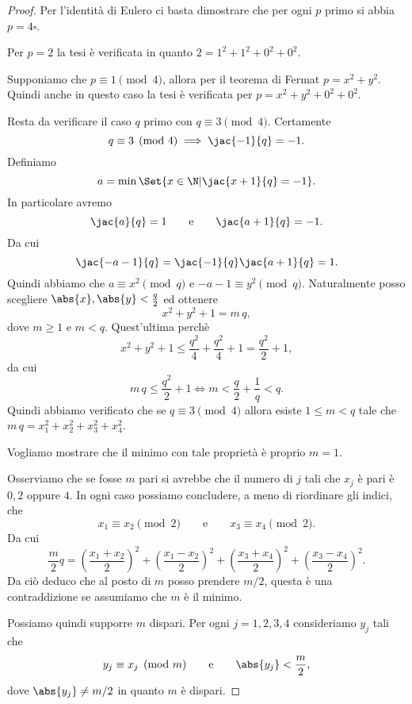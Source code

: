 \begin{proof}
	Per l'identità di Eulero ci basta dimostrare che per ogni \(p\) primo si abbia \(p=4\square\).

	Per \(p=2\) la tesi è verificata in quanto \(2=1^2+1^2+0^2+0^2\).

	Supponiamo che \(p\equiv 1 \pmod{4}\), allora per il teorema di Fermat \(p=x^2+y^2\).
	Quindi anche in questo caso la tesi è verificata per \(p=x^2+y^2+0^2+0^2\).

	Resta da verificare il caso \(q\) primo con \(q\equiv 3 \pmod{4}\).
	Certamente
	\[
		q\equiv 3 \pmod{4} \implies \jac{-1}{q} = -1.
	\]
	Definiamo
	\[
		a = \min\Set{x\in\N | \jac{x+1}{q}=-1}.
	\]
	In particolare avremo
	\[
		\jac{a}{q} = 1 \qquad\text{e}\qquad \jac{a+1}{q}=-1.
	\]
	Da cui
	\[
		\jac{-a-1}{q} = \jac{-1}{q}\jac{a+1}{q} = 1.
	\]
	Quindi abbiamo che \(a\equiv x^2 \pmod{q}\) e \(-a-1\equiv y^2 \pmod{q}\).
	Naturalmente posso scegliere \(\abs{x},\abs{y} < \frac{q}{2}\) ed ottenere
	\[
		x^2+y^2+1 =m\,q,
	\]
	dove \(m\ge 1\) e \(m<q\).
	Quest'ultima perchè
	\[
		x^2+y^2+1 \le \frac{q^2}{4} + \frac{q^2}{4} + 1 = \frac{q^2}{2}+1,
	\]
	da cui
	\[
		m\,q \le \frac{q^2}{2}+1 \iff m < \frac{q}{2}+\frac{1}{q} < q.
	\]
	Quindi abbiamo verificato che se \(q\equiv 3 \pmod{4}\) allora esiste \(1\le m<q\) tale che \(m\,q=x_1^2+x_2^2+x_3^2+x_4^2\).

	Vogliamo mostrare che il minimo con tale proprietà è proprio \(m=1\).

	Osserviamo che se fosse \(m\) pari si avrebbe che il numero di \(j\) tali che \(x_j\) è pari è \(0,2\) oppure \(4\).
	In ogni caso possiamo concludere, a meno di riordinare gli indici, che
	\[
		x_1 \equiv x_2 \pmod{2} \qquad\text{e}\qquad x_3 \equiv x_4 \pmod{2}.
	\]
	Da cui
	\[
		\frac{m}{2}q = \left( \frac{x_1+x_2}{2} \right)^2 + \left( \frac{x_1-x_2}{2} \right)^2 + \left( \frac{x_3+x_4}{2} \right)^2 + \left( \frac{x_3-x_4}{2} \right)^2.
	\]
	Da ciò deduco che al posto di \(m\) posso prendere \(m/2\), questa è una contraddizione se assumiamo che \(m\) è il minimo.

	Possiamo quindi supporre \(m\) dispari.
	Per ogni \(j=1,2,3,4\) consideriamo \(y_j\) tali che
	\[
		y_j \equiv x_j \pmod{m} \qquad\text{e}\qquad \abs{y_j} < \frac{m}{2},
	\]
	dove \(\abs{y_j}\neq m/2\) in quanto \(m\) è dispari.


\end{proof}
